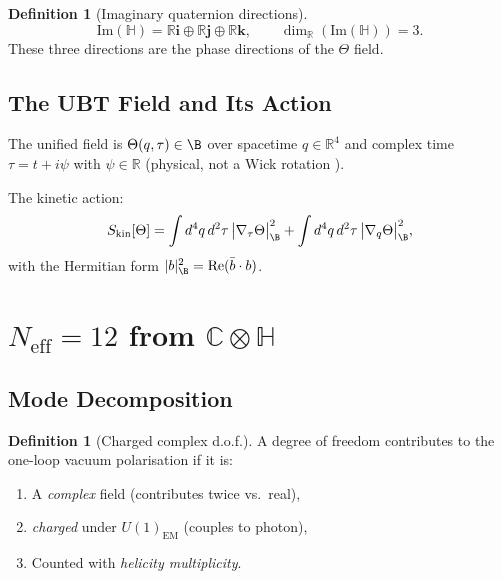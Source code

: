 \documentclass[12pt,a4paper]{article}
\theoremstyle{definition}
\newtheorem{definition}[theorem]{Definition}
\theoremstyle{remark}
\newcommand{\C}{\mathbb{C}}
\newcommand{\R}{\mathbb{R}}
\renewcommand{\H}{\mathbb{H}}
\newcommand{\re}{\mathrm{Re}}
\newcommand{\im}{\mathrm{Im}}
\begin{document}
\begin{definition}[Imaginary quaternion directions]
\[
  \im(\H) = \R\mathbf{i}\oplus\R\mathbf{j}\oplus\R\mathbf{k},
  \qquad
  \dim_{\R}(\im(\H)) = 3.
\]
These three directions are the phase directions of the $\Theta$ field.
\end{definition}

\subsection{The UBT Field and Its Action}

The unified field is $\Theta(q,\tau)\in\B$ over spacetime $q\in\R^4$
and complex time $\tau = t + i\psi$ with $\psi\in\R$ (physical, not
a Wick rotation \cite{UBT_psi}).

The kinetic action:
\begin{equation}
  S_{\mathrm{kin}}[\Theta] = \int d^4q\,d^2\tau\,
    \bigl|\nabla_\tau\Theta\bigr|^2_{\B}
  + \int d^4q\,d^2\tau\,
    \bigl|\nabla_q\Theta\bigr|^2_{\B},
\label{eq:action}
\end{equation}
with the Hermitian form $|b|^2_{\B} = \re(\bar{b}\cdot b)$.

\section{$N_{\mathrm{eff}} = 12$ from $\C\otimes\H$}
\label{sec:neff}

\subsection{Mode Decomposition}

\begin{definition}[Charged complex d.o.f.]
A degree of freedom contributes to the one-loop vacuum polarisation
if it is:
\begin{enumerate}
  \item[(i)] A \emph{complex} field (contributes twice vs.\ real),
  \item[(ii)] \emph{charged} under $U(1)_{\mathrm{EM}}$ (couples to photon),
  \item[(iii)] Counted with \emph{helicity multiplicity}.
\end{enumerate}
\end{definition}
\end{document}
